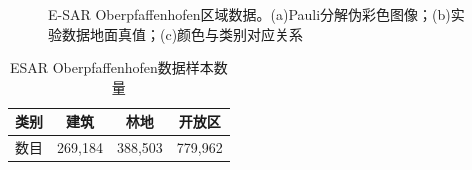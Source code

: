 \begin{figure}[ht]

    \caption{E-SAR Oberpfaffenhofen区域数据。(a)Pauli分解伪彩色图像；(b)实验数据地面真值；(c)颜色与类别对应关系}
\end{figure}

\begin{table}[ht]
    \caption{ESAR Oberpfaffenhofen数据样本数量}
    \label{tab:ober_sample}
    \centering
    \begin{tabular}{|c|c|c|c|}
        \hline
        类别 & 建筑      & 林地      & 开放区     \\ \hline
        数目 & 269,184 & 388,503 & 779,962 \\ \hline
    \end{tabular}
\end{table}

